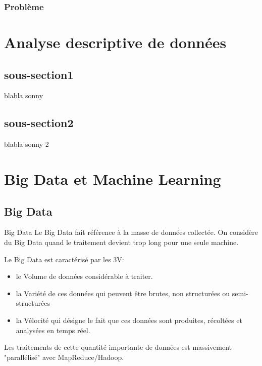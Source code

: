 	\begin{frame}
	\frametitle{Problème}
	\end{frame}
	
	\section{Analyse descriptive de données}
	\subsection{sous-section1}
	\begin{frame}
		blabla sonny
	\end{frame}
	\subsection{sous-section2}
	\begin{frame}
		blabla sonny 2
	\end{frame}
	
	\section{Big Data et Machine Learning}
	\subsection{Big Data}
	\begin{frame}
	\begin{block}{Big Data}
	Le Big Data fait référence à la masse de données collectée.
	On considère du Big Data quand le traitement devient trop long pour une seule machine.
	\end{block}
			
		Le Big Data est caractérisé par les  3V: 
		\begin{itemize}
			\item le Volume de données considérable à traiter.
			\item la Variété de ces données qui peuvent être brutes, non structurées ou semi-structurées
			\item la Vélocité qui désigne le fait que ces données sont produites, récoltées et analysées en temps réel.
		\end{itemize}
	Les traitements de cette quantité importante de données est massivement "parallélisé" avec MapReduce/Hadoop. 
		
	\end{frame}
